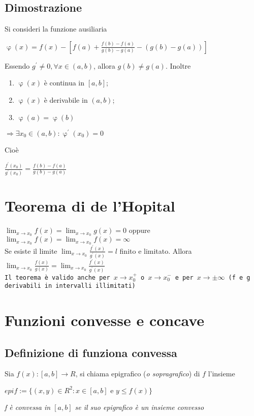 \documentclass{book}
\begin{document}
\subsection{Dimostrazione}
Si consideri la funzione ausiliaria
\begin{center}
	$\upvarphi(x)=f(x)-[f(a)+\frac{f(b)-f(a)}{g(b)-g(a)}-(g(b)-g(a))]$
\end{center}
Essendo $g^\prime\neq 0, \forall x \in (a,b)$, allora $g(b)\neq g(a)$. Inoltre
\begin{enumerate}
	\item $\upvarphi(x)$ è continua in $[a,b]$;
	\item $\upvarphi(x)$ è derivabile in $(a,b)$;
	\item $\upvarphi(a)=\upvarphi(b)$
\end{enumerate}
\begin{center}
	$\Rightarrow \exists x_0 \in (a,b):\upvarphi^\prime(x_0)=0$
\end{center}
Cioè
\begin{center}
	$\frac{f^\prime (x_0)}{g^\prime(x_0)}=\frac{f(b)-f(a)}{g(b)-g(a)}$
\end{center}
\section{Teorema di de l'Hopital}
$\lim_{x\to x_0}f(x)=\lim_{x\to x_0}g(x)=0$ oppure $\lim_{x\to
x_0}f(x)=\lim_{x\to x_0}f(x)=\infty$\\
Se esiste il limite $\lim_{x\to x_0}\frac{f^\prime(x)}{g^\prime(x)}=l$ finito e
limitato. Allora $\lim_{x\to x_0}\frac{f(x)}{g(x)}=\lim_{x\to
x_0}\frac{f^\prime(x)}{g^\prime(x)}$\\
\texttt{Il teorema è valido anche per $x\to x_0^+$ o $x\to x_0^-$ e per $x\to
\pm\infty$ (f e g derivabili in intervalli illimitati)}
\section{Funzioni convesse e concave}
\subsection{Definizione di funziona convessa}
Sia $f(x):[a,b]\to R$, si chiama epigrafico (\textit{o sopragrafico}) di $f$
l'insieme
\begin{center}
	$epif:=\{(x,y)\in R^2:x\in[a,b]\text{ e }y\leq f(x)\}$
\end{center}
\textit{f è convessa in $[a,b]$ se il suo epigrafico è un insieme convesso}
\end{document}
